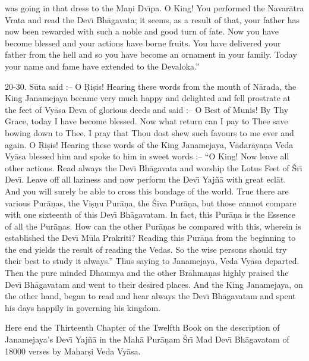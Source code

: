was going in that dress to the Ma\d{n}i Dv\={\i}pa. O King! You performed the Navar\=atra Vrata and read the Dev\={\i} Bh\=agavata; it seems, as a result of that, your father has now been rewarded with such a noble and good turn of fate. Now you have become blessed and your actions have borne fruits. You have delivered your father from the hell and so you have become an ornament in your family. Today your name and fame have extended to the Devaloka.''

20-30. S\=uta said :-- O \d{R}i\d{s}is! Hearing these words from the mouth of N\=arada, the King Janamejaya became very much happy and delighted and fell prostrate at the feet of Vy\=asa Deva of glorious deeds and said :-- O Best of Munis! By Thy Grace, today I have become blessed. Now what return can I pay to Thee save bowing down to Thee. I pray that Thou dost shew such favours to me ever and again. O \d{R}i\d{s}is! Hearing these words of the King Janamejaya, V\=adar\=aya\d{n}a Veda Vy\=asa blessed him and spoke to him in sweet words :-- ``O King! Now leave all other actions. Read always the Dev\={\i} Bh\=agavata and worship the Lotus Feet of \'Sr\={\i} Dev\={\i}. Leave off all laziness and now perform the Dev\={\i} Yaj\~n\=a with great ecl\=at. And you will surely be able to cross this bondage of the world. True there are various Pur\=a\d{n}as, the Vi\d{s}\d{n}u Pur\=a\d{n}a, the \'Siva Pur\=a\d{n}a, but those cannot compare with one sixteenth of this Dev\={\i} Bh\=agavatam. In fact, this Pur\=a\d{n}a is the Essence of all the Pur\=a\d{n}as. How can the other Pur\=a\d{n}as be compared with this, wherein is established the Dev\={\i} M\=ula Prakriti? Reading this Pur\=a\d{n}a from the beginning to the end yields the result of reading the Vedas. So the wise persons should try their best to study it always.'' Thus saying to Janamejaya, Veda Vy\=asa departed. Then the pure minded Dhaumya and the other Br\=ahma\d{n}as highly praised the Dev\={\i} Bh\=agavatam and went to their desired places. And the King Janamejaya, on the other hand, began to read and hear always the Dev\={\i} Bh\=agavatam and spent his days happily in governing his kingdom.

Here end the Thirteenth Chapter of the Twelfth Book on the description of Janamejaya's Dev\={\i} Yaj\~n\=a in the Mah\=a Pur\=a\d{n}am \'Sr\={\i} Mad Dev\={\i} Bh\=agavatam of 18000 verses by Mahar\d{s}i Veda Vy\=asa.




